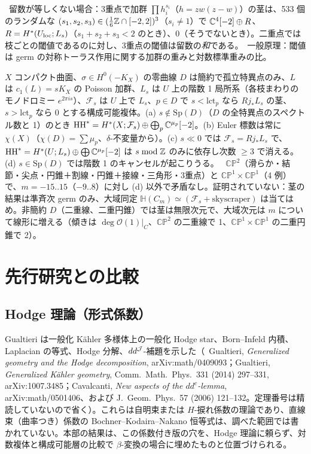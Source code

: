 \tV\ 留数が等しくない場合：3重点で加群 $\prod h_i^{s_i}$（$h=zw(z-w)$）の茎は、533 個のランダムな $(s_1,s_2,s_3)\in(\frac16\mathbb Z\cap[-2,2])^3$（$s_i\ne1$）で $\mathbb C^4[-2]\oplus R$、$R=H^*(U_{\rm loc};L_s)$（$s_1+s_2+s_3<2$ のとき）、$0$（そうでないとき）。二重点では枝ごとの閾値であるのに対し、3重点の閾値は留数の\emph{和}である。\tK\ 一般原理：閾値は germ の対称トーラス作用に関する加群の重みと対数標準重みの比。

\begin{conj}\tK
$X$ コンパクト曲面、$\sigma\in H^0(-K_X)$ の零曲線 $D$ は簡約で孤立特異点のみ、$L$ は $c_1(L)=sK_X$ の Poisson 加群、$L_s$ は $U$ 上の階数 1 局所系（各枝まわりのモノドロミー $e^{2\pi is}$）、$\mathcal F_s$ は $U$ 上で $L_s$、$p\in D$ で $s<\mathrm{lct}_p$ なら $Rj_*L_s$ の茎、$s>\mathrm{lct}_p$ なら 0 とする構成可能複体。(a) $s\notin\mathrm{Sp}(D)$（$D$ の全特異点のスペクトル数と 1）のとき $\mathrm{HH}^*=H^*(X;\mathcal F_s)\oplus\bigoplus_p\mathbb C^{\mu_p}[-2]$。(b) Euler 標数は常に $\chi(X)$（$\chi(D)=\sum\mu_p$、$\delta$-不変量から\tP）。(c) $s\ll0$ では $\mathcal F_s=Rj_*L_s$ で、$\mathrm{HH}^*=H^*(U;L_s)\oplus\bigoplus\mathbb C^{\mu_p}[-2]$ は $s\bmod\mathbb Z$ のみに依存し次数 $\ge3$ で消える。(d) $s\in\mathrm{Sp}(D)$ では階数 1 のキャンセルが起こりうる。
\tV\ $\mathbb{CP}^2$（滑らか・結節・尖点・円錐＋割線・円錐＋接線・三角形・3重点）と $\mathbb{CP}^1\times\mathbb{CP}^1$（4 例）で、$m=-15..15$（$-9..8$）に対し (d) 以外で矛盾なし。証明されていない：茎の結果は準斉次 germ のみ、大域同定 $\mathbb H(C_m)\simeq(\mathcal F_s+\text{skyscraper})$ は当てはめ。非簡約 $D$（二重線、二重円錐）では茎は無限次元で、大域次元は $m$ について線形に増える（傾きは $\deg\mathcal O(1)|_C$、$\mathbb{CP}^2$ の二重線で 1、$\mathbb{CP}^1\times\mathbb{CP}^1$ の二重円錐で 2）。
\end{conj}
\section{先行研究との比較}\label{p1:sec:compare}
\subsection{Hodge 理論（形式係数）}
Gualtieri は一般化 Kähler 多様体上の一般化 Hodge star、Born--Infeld 内積、Laplacian の等式、Hodge 分解、$dd^{\mathcal J}$-補題を示した（\tC\ Gualtieri, \emph{Generalized geometry and the Hodge decomposition}, arXiv:math/0409093；Gualtieri, \emph{Generalized K\"ahler geometry}, Comm.\ Math.\ Phys.\ 331 (2014) 297--331, arXiv:1007.3485；Cavalcanti, \emph{New aspects of the $dd^c$-lemma}, arXiv:math/0501406、および J.\ Geom.\ Phys.\ 57 (2006) 121--132。定理番号は精読していないので省く\tQ）。これらは自明束または $H$-捩れ係数の理論であり、直線束（曲率つき）係数の Bochner--Kodaira--Nakano 恒等式は、調べた範囲では書かれていない。本部の結果は、この係数付き版の穴を、Hodge 理論に頼らず、対数複体と構成可能層の比較で $\beta$-変換の場合に埋めたものと位置づけられる。

